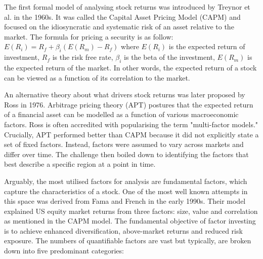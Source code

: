 \documentclass[10pt,onecolumn,letterpaper]{article}
\begin{document}
The first formal model\cite{Treynor} of analysing stock returns was introduced by Treynor et al. in the 1960s. It was called the Capital Asset Pricing Model (CAPM) and focused on the idiosyncratic and systematic risk of an asset relative to the market. The formula for pricing a security is as follow: $E(R_{i}) = R_{f} + \beta_{i}(E(R_{m}) - R_{f}) $ where $E(R_{i})$ is the expected return of investment, $R_{f}$ is the risk free rate, $\beta_{i}$ is the beta of the investment, $E(R_{m})$ is the expected return of the market. In other words, the expected return of a stock can be viewed as a function of its correlation to the market. 

An alternative theory\cite{Ross} about what drivers stock returns was later proposed by Ross in 1976. Arbitrage pricing theory (APT) postures that the expected return of a financial asset can be modelled as a function of various macroeconomic factors. Ross is often accredited with popularising the term "multi-factor models." Crucially, APT performed better than CAPM because it did not explicitly state a set of fixed factors. Instead, factors were assumed to vary across markets and differ over time. The challenge then boiled down to identifying the factors that best describe a specific region at a point in time. 

Arguably, the most utilised factors for analysis are fundamental factors, which capture the characteristics of a stock. One of the most well known attempts in this space was derived from Fama and French in the early 1990s. Their model\cite{Fama} explained US equity market returns from three factors: size, value and correlation as mentioned in the CAPM model. The fundamental objective of factor investing is to achieve enhanced diversification, above-market returns and reduced risk exposure. The numbers of quantifiable factors are vast but typically, are broken down into five predominant categories: 
\end{document}

